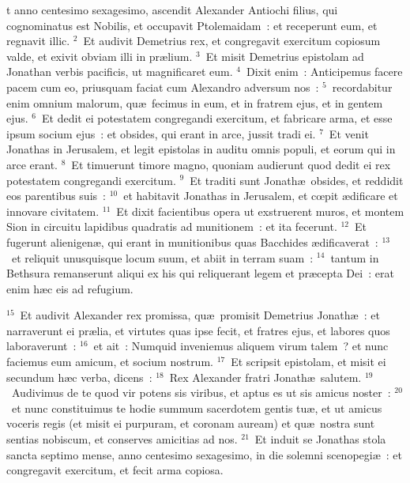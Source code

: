 \bchapter
{}t anno centesimo sexagesimo, ascendit Alexander Antiochi filius, qui cognominatus est Nobilis, et occupavit Ptolemaidam~: et receperunt eum, et regnavit illic.
${}^{2}$~Et audivit Demetrius rex, et congregavit exercitum copiosum valde, et exivit obviam illi in pr\ae lium.
${}^{3}$~Et misit Demetrius epistolam ad Jonathan verbis pacificis, ut magnificaret eum.
${}^{4}$~Dixit enim~: Anticipemus facere pacem cum eo, priusquam faciat cum Alexandro adversum nos~:
${}^{5}$~recordabitur enim omnium malorum, qu\ae\ fecimus in eum, et in fratrem ejus, et in gentem ejus.
${}^{6}$~Et dedit ei potestatem congregandi exercitum, et fabricare arma, et esse ipsum socium ejus~: et obsides, qui erant in arce, jussit tradi ei.
${}^{7}$~Et venit Jonathas in Jerusalem, et legit epistolas in auditu omnis populi, et eorum qui in arce erant.
${}^{8}$~Et timuerunt timore magno, quoniam audierunt quod dedit ei rex potestatem congregandi exercitum.
${}^{9}$~Et traditi sunt Jonath\ae\ obsides, et reddidit eos parentibus suis~:
${}^{10}$~et habitavit Jonathas in Jerusalem, et cœpit \ae dificare et innovare civitatem.
${}^{11}$~Et dixit facientibus opera ut exstruerent muros, et montem Sion in circuitu lapidibus quadratis ad munitionem~: et ita fecerunt.
${}^{12}$~Et fugerunt alienigen\ae , qui erant in munitionibus quas Bacchides \ae dificaverat~:
${}^{13}$~et reliquit unusquisque locum suum, et abiit in terram suam~:
${}^{14}$~tantum in Bethsura remanserunt aliqui ex his qui reliquerant legem et pr\ae cepta Dei~: erat enim h\ae c eis ad refugium.


${}^{15}$~Et audivit Alexander rex promissa, qu\ae\ promisit Demetrius Jonath\ae~: et narraverunt ei pr\ae lia, et virtutes quas ipse fecit, et fratres ejus, et labores quos laboraverunt~:
${}^{16}$~et ait~: Numquid inveniemus aliquem virum talem~? et nunc faciemus eum amicum, et socium nostrum.
${}^{17}$~Et scripsit epistolam, et misit ei secundum h\ae c verba, dicens~:
${}^{18}$~Rex Alexander fratri Jonath\ae\ salutem.
${}^{19}$~Audivimus de te quod vir potens sis viribus, et aptus es ut sis amicus noster~:
${}^{20}$~et nunc constituimus te hodie summum sacerdotem gentis tu\ae , et ut amicus voceris regis (et misit ei purpuram, et coronam auream) et qu\ae\ nostra sunt sentias nobiscum, et conserves amicitias ad nos.
${}^{21}$~Et induit se Jonathas stola sancta septimo mense, anno centesimo sexagesimo, in die solemni scenopegi\ae~: et congregavit exercitum, et fecit arma copiosa.


